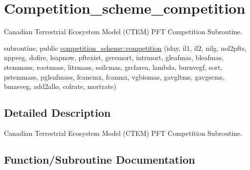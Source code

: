 \hypertarget{group__competition__scheme__competition}{}\section{Competition\+\_\+scheme\+\_\+competition}
\label{group__competition__scheme__competition}


Canadian Terrestrial Ecosystem Model (C\+T\+E\+M) P\+F\+T Competition Subroutine.  


\begin{DoxyCompactItemize}
\item 
subroutine, public \hyperlink{group__competition__scheme__competition_ga008cbfcefd33aaccb8f2b81cf8326451}{competition\+\_\+scheme\+::competition} (iday, il1, il2, nilg, nol2pfts, nppveg, dofire, leapnow, pftexist, geremort, intrmort, gleafmas, bleafmas, stemmass, rootmass, litrmass, soilcmas, grclarea, lambda, burnvegf, sort, pstemmass, pgleafmass, fcancmx, fcanmx, vgbiomas, gavgltms, gavgscms, bmasveg, add2allo, colrate, mortrate)
\end{DoxyCompactItemize}


\subsection{Detailed Description}
Canadian Terrestrial Ecosystem Model (C\+T\+E\+M) P\+F\+T Competition Subroutine. 



\subsection{Function/\+Subroutine Documentation}
\hypertarget{group__competition__scheme__competition_ga008cbfcefd33aaccb8f2b81cf8326451}{}
